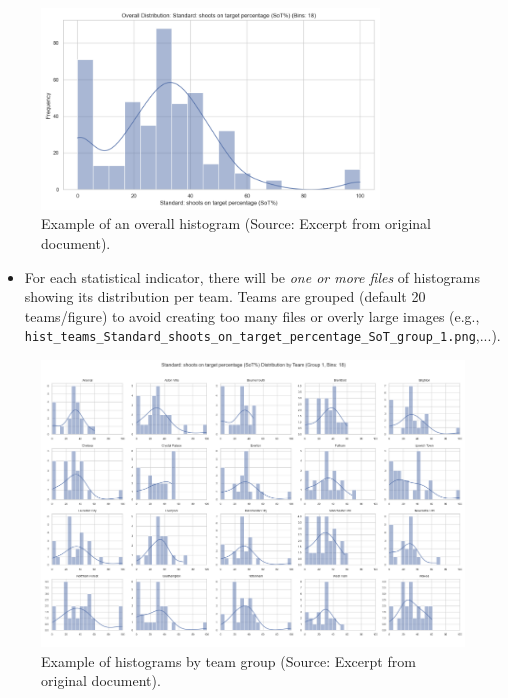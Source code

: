 \documentclass[12pt, a4paper]{report}
\begin{document}
\begin{figure}[H]
    \centering
    \includegraphics[width=0.8\textwidth]{overall.png}
    \caption{Example of an overall histogram (Source: Excerpt from original document).}
    \label{fig:hist_overall_sot}
\end{figure}

\begin{itemize}
    \item For each statistical indicator, there will be \textit{one or more files} of histograms showing its distribution per team. Teams are grouped (default 20 teams/figure) to avoid creating too many files or overly large images \sloppypar
    (e.g., \texttt{hist\_teams\_Standard\_shoots\_on\_target\_percentage\_SoT\_group\_1.png},...).
\end{itemize}

\begin{figure}[H]
    \centering
    \includegraphics[width=\textwidth]{by_team.png}
    \caption{Example of histograms by team group (Source: Excerpt from original document).}
    \label{fig:hist_teams_sot_group1}
\end{figure}
\end{document}
